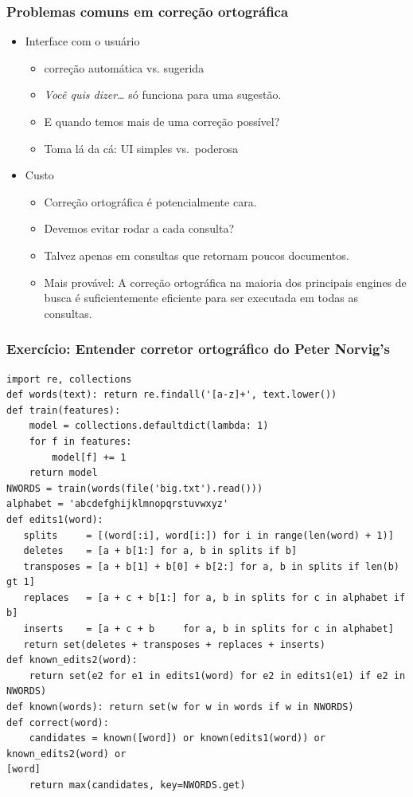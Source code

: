 \documentclass[compress]{beamer}
\begin{document}
\begin{frame}[<+->]
\frametitle{Problemas comuns em correção ortográfica}
\pause[2]
\begin{itemize}
\item Interface com o usuário
\begin{itemize}
\item correção automática vs. sugerida
\item \emph{Você quis dizer\ldots} só funciona para uma sugestão.
\item E quando temos mais de uma correção possível?
\item Toma lá da cá: UI simples vs.\ poderosa
\end{itemize}
\item Custo
\begin{itemize}
\item Correção ortográfica é potencialmente cara.
\item Devemos evitar rodar a cada consulta?
\item Talvez apenas em consultas que retornam poucos documentos.
\item Mais provável: A correção ortográfica na maioria dos principais 
engines de busca é suficientemente eficiente para ser executada em todas as 
consultas.
\end{itemize}
\end{itemize}
\end{frame}

\begin{frame}[containsverbatim,shrink=20]
\frametitle{Exercício: Entender corretor ortográfico do Peter Norvig's}
\begin{verbatim}
import re, collections
def words(text): return re.findall('[a-z]+', text.lower()) 
def train(features):
    model = collections.defaultdict(lambda: 1)
    for f in features:
        model[f] += 1
    return model
NWORDS = train(words(file('big.txt').read()))
alphabet = 'abcdefghijklmnopqrstuvwxyz'
def edits1(word):
   splits     = [(word[:i], word[i:]) for i in range(len(word) + 1)]
   deletes    = [a + b[1:] for a, b in splits if b]
   transposes = [a + b[1] + b[0] + b[2:] for a, b in splits if len(b) gt 1]
   replaces   = [a + c + b[1:] for a, b in splits for c in alphabet if b]
   inserts    = [a + c + b     for a, b in splits for c in alphabet]
   return set(deletes + transposes + replaces + inserts)
def known_edits2(word):
    return set(e2 for e1 in edits1(word) for e2 in edits1(e1) if e2 in NWORDS)
def known(words): return set(w for w in words if w in NWORDS)
def correct(word):
    candidates = known([word]) or known(edits1(word)) or known_edits2(word) or 
[word]
    return max(candidates, key=NWORDS.get)
\end{verbatim}
\end{frame}
\end{document}
